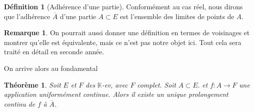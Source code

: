 \documentclass[french]{book}
\theoremstyle{plain}
\newtheorem{thm}{Théorème}[chapter]
\theoremstyle{definition}
\newtheorem{dfn}{Définition}[chapter]
\newtheorem{rmq}{Remarque}[chapter]
\theoremstyle{remark}
\begin{document}
\begin{dfn}[Adhérence d'une partie]
	Conformément au cas réel, nous dirons que l'adhérence $\overline{A}$ d'une partie $A \subset E$ est l'ensemble des limites de points de $A$.
\end{dfn}
\begin{rmq}
	On pourrait aussi donner une définition en termes de voisinages et montrer qu'elle est équivalente, mais ce n'est pas notre objet ici. Tout cela sera traité en détail en seconde année.
\end{rmq}
On arrive alors au fondamental
\begin{thm}
	Soit $E$ et $F$ des $\mathbb{K}$-ev, avec $F$ complet. Soit $A \subset E.$ et $f: A \rightarrow F$ une application uniformément continue. Alors il existe un unique prolongement continu de $f$ à $\overline{A}$.
\end{thm}
\end{document}

